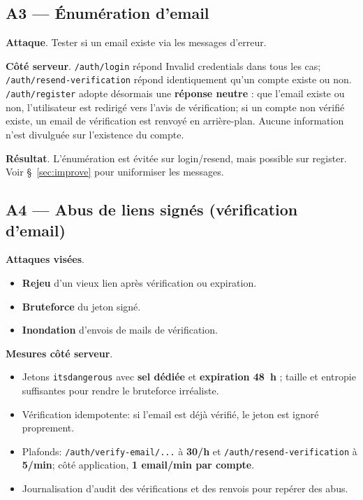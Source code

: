 \subsection*{A3 — Énumération d'email}
\textbf{Attaque}. Tester si un email existe via les messages d'erreur.

\textbf{Côté serveur}. \texttt{/auth/login} répond \og Invalid credentials \fg{} dans tous les cas; \texttt{/auth/resend-verification} répond identiquement qu'un compte existe ou non. \texttt{/auth/register} adopte désormais une \textbf{réponse neutre} : que l'email existe ou non, l'utilisateur est redirigé vers l'avis de vérification; si un compte non vérifié existe, un email de vérification est renvoyé en arrière-plan. Aucune information n'est divulguée sur l'existence du compte.

\textbf{Résultat}. L'énumération est évitée sur login/resend, mais possible sur register. Voir \S~\ref{sec:improve} pour uniformiser les messages.

 

\subsection*{A4 — Abus de liens signés (vérification d'email)}
\textbf{Attaques visées}.
\begin{itemize}
  \item \textbf{Rejeu} d'un vieux lien après vérification ou expiration.
  \item \textbf{Bruteforce} du jeton signé.
  \item \textbf{Inondation} d'envois de mails de vérification.
\end{itemize}

\textbf{Mesures côté serveur}.
\begin{itemize}
  \item Jetons \texttt{itsdangerous} avec \textbf{sel dédiée} et \textbf{expiration 48~h} ; taille et entropie suffisantes pour rendre le bruteforce irréaliste.
  \item Vérification idempotente: si l'email est déjà vérifié, le jeton est ignoré proprement.
  \item Plafonds: \texttt{/auth/verify-email/...} à \textbf{30/h} et \texttt{/auth/resend-verification} à \textbf{5/min}; côté application, \textbf{1 email/min par compte}.
  \item Journalisation d'audit des vérifications et des renvois pour repérer des abus.
\end{itemize}

